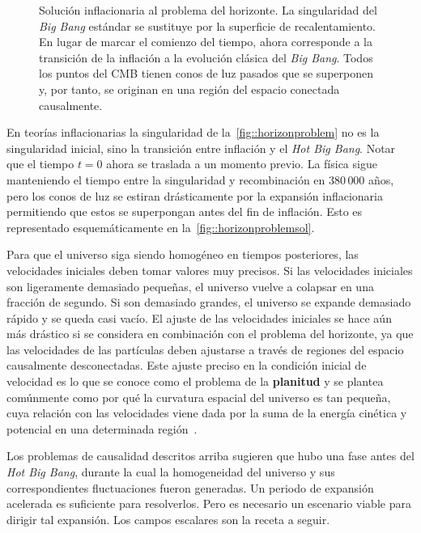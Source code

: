 \begin{figure}
    \centering
    \def\svgwidth{0.72\textwidth}
    
    \caption[Solución inflacionaria al problema del horizonte]{Solución inflacionaria al problema del horizonte. La singularidad del \textit{Big Bang} estándar se sustituye por la superficie de recalentamiento. En lugar de marcar el comienzo del tiempo, ahora corresponde a la transición de la inflación a la evolución clásica del \textit{Big Bang}. Todos los puntos del CMB tienen conos de luz pasados que se superponen y, por tanto, se originan en una región del espacio conectada causalmente.}
    \label{fig::horizonproblemsol}
\end{figure}
En teorías inflacionarias la singularidad de la~\autoref{fig::horizonproblem} no es la singularidad inicial, sino la transición entre inflación y el \textit{Hot Big Bang}. Notar que el tiempo \(t=0\) ahora se traslada a un momento previo. La física sigue manteniendo el tiempo entre la singularidad y recombinación en \(380\,000\) años, pero los conos de luz se estiran drásticamente por la expansión inflacionaria permitiendo que estos se superpongan antes del fin de inflación. Esto es representado esquemáticamente en la~\autoref{fig::horizonproblemsol}.

Para que el universo siga siendo homogéneo en tiempos posteriores, las velocidades iniciales deben tomar valores muy precisos. Si las velocidades iniciales son ligeramente demasiado pequeñas, el universo vuelve a colapsar en una fracción de segundo. Si son demasiado grandes, el universo se expande demasiado rápido y se queda casi vacío. El ajuste de las velocidades iniciales se hace aún más drástico si se considera en combinación con el problema del horizonte, ya que las velocidades de las partículas deben ajustarse a través de regiones del espacio causalmente desconectadas. Este ajuste preciso en la condición inicial de velocidad es lo que se conoce como el problema de la \textbf{planitud} y se plantea comúnmente como por qué la curvatura espacial del universo es tan pequeña, cuya relación con las velocidades viene dada por la suma de la energía cinética y potencial en una determinada región~\cite{baumann2022cosmology}.

Los problemas de causalidad descritos arriba sugieren que hubo una fase antes del \textit{Hot Big Bang}, durante la cual la homogeneidad del universo y sus correspondientes fluctuaciones fueron generadas. Un periodo de expansión acelerada es suficiente para resolverlos. Pero es necesario un escenario viable para dirigir tal expansión. Los campos escalares son la receta a seguir.
